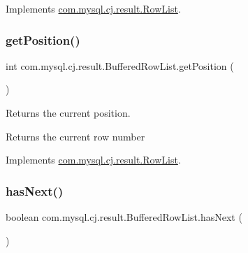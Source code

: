 Implements \mbox{\hyperlink{interfacecom_1_1mysql_1_1cj_1_1result_1_1_row_list_ac5f33b198acdb87ba7ab84da6cddef93}{com.\+mysql.\+cj.\+result.\+Row\+List}}.

\mbox{\label{classcom_1_1mysql_1_1cj_1_1result_1_1_buffered_row_list_a6d18ed3e3cf3ebced974d1cd7d8ca9ec}} 
\subsubsection{\texorpdfstring{get\+Position()}{getPosition()}}
{\footnotesize\ttfamily int com.\+mysql.\+cj.\+result.\+Buffered\+Row\+List.\+get\+Position (\begin{DoxyParamCaption}{ }\end{DoxyParamCaption})}

Returns the current position.

\begin{DoxyReturn}{Returns}
the current row number 
\end{DoxyReturn}


Implements \mbox{\hyperlink{interfacecom_1_1mysql_1_1cj_1_1result_1_1_row_list_a403554a1f4945bd623ed3b7489674a2e}{com.\+mysql.\+cj.\+result.\+Row\+List}}.

\mbox{\label{classcom_1_1mysql_1_1cj_1_1result_1_1_buffered_row_list_a66307a61a8611cb5c0d584157b3afe30}} 
\subsubsection{\texorpdfstring{has\+Next()}{hasNext()}}
{\footnotesize\ttfamily boolean com.\+mysql.\+cj.\+result.\+Buffered\+Row\+List.\+has\+Next (\begin{DoxyParamCaption}{ }\end{DoxyParamCaption})}

